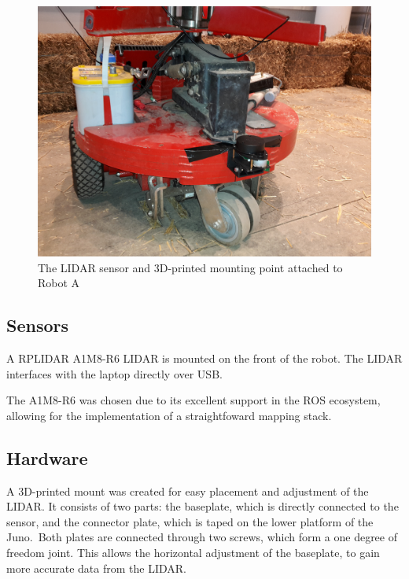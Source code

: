 \documentclass[11pt]{article}
\begin{document}
	\begin{figure}[h!]
		\centering
		\includegraphics[scale=0.1]{robot_a}
		\caption{The LIDAR sensor and 3D-printed mounting point attached to Robot A}
	\end{figure}
	
	\subsection{Sensors}
	A RPLIDAR A1M8-R6 LIDAR is mounted on the front of the robot. The LIDAR interfaces with the laptop directly over USB. \newline
	
	The A1M8-R6 was chosen due to its excellent support in the ROS ecosystem, allowing for the implementation of a straightfoward mapping stack. 
	
	\subsection{Hardware}
	A 3D-printed mount was created for easy placement and adjustment of the LIDAR. It consists of two parts: the baseplate, which is directly connected to the sensor, and the connector plate, which is taped on the lower platform of the Juno. Both plates are connected through two screws, which form a one degree of freedom joint. This allows the horizontal adjustment of the baseplate, to gain more accurate data from the LIDAR. 
	
\end{document}
